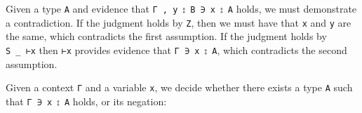 Given a type \texttt{A} and evidence that
\texttt{Γ\ ,\ y\ ⦂\ B\ ∋\ x\ ⦂\ A} holds, we must demonstrate a
contradiction. If the judgment holds by \texttt{Z}, then we must have
that \texttt{x} and \texttt{y} are the same, which contradicts the first
assumption. If the judgment holds by \texttt{S\ \_\ ⊢x} then \texttt{⊢x}
provides evidence that \texttt{Γ\ ∋\ x\ ⦂\ A}, which contradicts the
second assumption.

Given a context \texttt{Γ} and a variable \texttt{x}, we decide whether
there exists a type \texttt{A} such that \texttt{Γ\ ∋\ x\ ⦂\ A} holds,
or its negation:

\begin{fence}
\begin{code}%
\>[0]\AgdaSpace{}%
\AgdaSymbol{:}\AgdaSpace{}%
\AgdaSpace{}%
\AgdaSymbol{(}\AgdaSpace{}%
\AgdaSymbol{:}\AgdaSpace{}%
\AgdaSymbol{)}\AgdaSpace{}%
\AgdaSymbol{(}\AgdaSpace{}%
\AgdaSymbol{:}\AgdaSpace{}%
\AgdaSymbol{)}\<%
\\
\>[0][@{}l@{\AgdaIndent{0}}]%
\>[4]\AgdaComment{-----------------------}\<%
\\
\>[0][@{}l@{\AgdaIndent{0}}]%
\>[2]\AgdaSpace{}%
\AgdaSpace{}%
\AgdaSymbol{(}\AgdaFunction{∃[}\AgdaSpace{}%
\AgdaSpace{}%
\AgdaFunction{]}\AgdaSymbol{(}\AgdaSpace{}%
\AgdaSpace{}%
\AgdaSpace{}%
\AgdaSpace{}%
\AgdaSymbol{))}\<%
\\
\>[0]\AgdaSpace{}%
\AgdaSpace{}%
%
\>[34]\AgdaSymbol{=}%
\>[37]%
\>[41]\AgdaSpace{}%
\AgdaSymbol{())}\<%
\\
\>[0]\AgdaSpace{}%
\AgdaSymbol{(}\AgdaSpace{}%
\AgdaOperator{\AgdaInductiveConstructor{,}}\AgdaSpace{}%
\AgdaSpace{}%
\AgdaSpace{}%
\AgdaSymbol{)}\AgdaSpace{}%
\AgdaSpace{}%
\AgdaSpace{}%
\AgdaSpace{}%
\AgdaSpace{}%
\<%
\\
\>[0]\AgdaSpace{}%
\AgdaSymbol{|}\AgdaSpace{}%
\AgdaSpace{}%
%
\>[34]\AgdaSymbol{=}%
\>[37]\AgdaSpace{}%
\AgdaSpace{}%

\end{code}
\end{fence}
